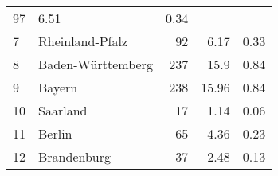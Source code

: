 \begin{longtable}{lXrrr}
       \num{97} &
       \num[round-mode=places,round-precision=2]{6.51} &
         \num[round-mode=places,round-precision=2]{0.34} \\

     7 &
     \multicolumn{1}{X}{ Rheinland-Pfalz   } &


       \num{92} &
       \num[round-mode=places,round-precision=2]{6.17} &
         \num[round-mode=places,round-precision=2]{0.33} \\

     8 &
     \multicolumn{1}{X}{ Baden-Württemberg   } &


       \num{237} &
       \num[round-mode=places,round-precision=2]{15.9} &
         \num[round-mode=places,round-precision=2]{0.84} \\

     9 &
     \multicolumn{1}{X}{ Bayern   } &


       \num{238} &
       \num[round-mode=places,round-precision=2]{15.96} &
         \num[round-mode=places,round-precision=2]{0.84} \\

     10 &
     \multicolumn{1}{X}{ Saarland   } &


       \num{17} &
       \num[round-mode=places,round-precision=2]{1.14} &
         \num[round-mode=places,round-precision=2]{0.06} \\

     11 &
     \multicolumn{1}{X}{ Berlin   } &


       \num{65} &
       \num[round-mode=places,round-precision=2]{4.36} &
         \num[round-mode=places,round-precision=2]{0.23} \\

     12 &
     \multicolumn{1}{X}{ Brandenburg   } &


       \num{37} &
       \num[round-mode=places,round-precision=2]{2.48} &
         \num[round-mode=places,round-precision=2]{0.13} \\


\end{longtable}
